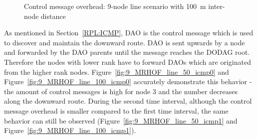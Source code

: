 \begin{figure}[p]
  \begin{center}
    \leavevmode
    \caption{Control message overhead: 9-node line scenario with 100~m inter-node distance}
    \label{fig:9_MRHOF_line_100_icmp}
  \end{center}
   \vspace{-20pt}
\end{figure}

As mentioned in Section~\ref{RPL:ICMP}, DAO is the control message which is used to discover and maintain the downward  route. DAO is sent upwards by a node and forwarded by the DAO parents until the message reaches the DODAG root. Therefore the nodes with lower rank have to forward DAOs which are originated from the higher rank nodes. Figure~\ref{fig:9_MRHOF_line_50_icmp0} and Figure~\ref{fig:9_MRHOF_line_100_icmp0} accurately demonstrate this behavior - the amount of control messages is high for node 3 and the number decreases along the downward route. During the second time interval, although the control message overhead is smaller compared to the first time interval, the same behavior can still be observed (Figure~\ref{fig:9_MRHOF_line_50_icmp1} and Figure~\ref{fig:9_MRHOF_line_100_icmp1}).

